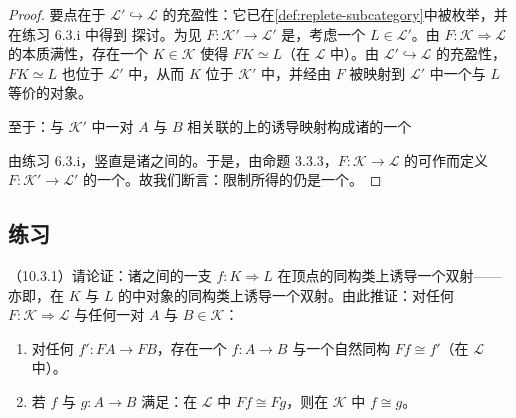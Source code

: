 \begin{proof}
要点在于\trCosmologicalEmbedding{} $\mathcal{L}'\hookrightarrow\mathcal{L}$ 的充盈性：它已在\cref{def:replete-subcategory}中被枚举，并在练习 6.3.i 中得到%
探讨。为见 $F\colon\mathcal{K}'\to\mathcal{L}'$ 是\trEssentiallySurjective{}，考虑一个\trInfinityCategory{} $L\in\mathcal{L}'$。由\trCosmologicalBiequivalence{} $F\colon\mathcal{K}\Rightarrow\mathcal{L}$ 的本质满性，存在一个\trInfinityCategory{} $K\in\mathcal{K}$ 使得 $FK\simeq L$（在 $\mathcal{L}$ 中）。由 $\mathcal{L}'\hookrightarrow\mathcal{L}$ 的充盈性，\trEquivalence{} $FK\simeq L$ 也位于 $\mathcal{L}'$ 中，从而 $K$ 位于\trPullback{} $\mathcal{K}'$ 中，并经由 $F$ 被映射到 $\mathcal{L}'$ 中一个与 $L$ 等价的对象。

至于\trLocalEquivalence：与 $\mathcal{K}'$ 中一对\trInfinityCategory{} $A$ 与 $B$ 相关联的\trFunctorSpace{}上的诱导映射构成诸\trQuasiCategory{}的一个\trPullback
\begin{center}
\end{center}
由练习 6.3.i，竖直\trFunctor{}是诸\trQuasiCategory{}之间的\trIsofibration。于是，由命题 3.3.3，$F\colon\mathcal{K}\to\mathcal{L}$ 的\trLocalEquivalence{}可作\trPullback{}而定义 $F\colon\mathcal{K}'\to\mathcal{L}'$ 的一个\trLocalEquivalence。故我们断言：限制所得的\trFunctor{}仍是一个\trCosmologicalBiequivalence。
\end{proof}

\subsection*{练习}

\begin{exercise}\label{ex:equivalence-reflects-isomorphism-classes}
（10.3.1）请论证：诸\trQuasiCategory{}之间的一支\trEquivalence{} $f\colon K\Rightarrow L$ 在顶点的同构类上诱导一个双射——亦即，在 $K$ 与 $L$ 的\trHomotopyCategory{}中对象的同构类上诱导一个双射。由此推证：对任何\trCosmologicalBiequivalence{} $F\colon\mathcal{K}\Rightarrow\mathcal{L}$ 与任何一对\trInfinityCategory{} $A$ 与 $B\in\mathcal{K}$：
\begin{enumerate}[label=(\roman*)]
\item 对任何\trFunctor{} $f'\colon FA\to FB$，存在一个\trFunctor{} $f\colon A\to B$ 与一个自然同构 $Ff\cong f'$（在 $\mathcal{L}$ 中）。
\item 若\trFunctor{} $f$ 与 $g\colon A\to B$ 满足：在 $\mathcal{L}$ 中 $Ff\cong Fg$，则在 $\mathcal{K}$ 中 $f\cong g$。
\end{enumerate}
\end{exercise}


